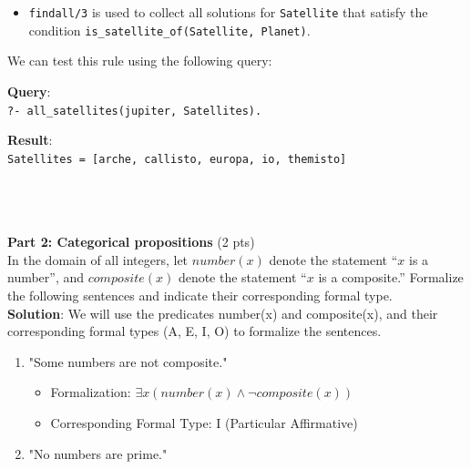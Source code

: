 \documentclass[12pt]{article}
\begin{document}
\begin{spacing}{1.5}
\begin{enumerate}
\begin{itemize}
		      	\item \texttt{findall/3} is used to collect all solutions for \texttt{Satellite} that satisfy the condition \texttt{is\_satellite\_of(Satellite, Planet)}.
		      \end{itemize}
		      		      		      		      		      		      		      		      
		      We can test this rule using the following query:
		      		      		      		      		      		      		      		      
		      \textbf{Query}:\\
		      \texttt{?- all\_satellites(jupiter, Satellites).}
		      		      		      		      		      		      		      		      
		      \textbf{Result}:\\
		      \texttt{Satellites = [arche, callisto, europa, io, themisto]}\\ \\ \\ \\
	\end{enumerate}
								
	\noindent \textbf{Part 2: Categorical propositions} (2 pts)\\
	In the domain of all integers, let $number(x)$ denote the statement “$x$ is a number”, and $composite(x)$ denote the statement “$x$ is a composite.” Formalize the following sentences and indicate their corresponding formal type.\\
							
	\textbf{Solution}: We will use the predicates number(x) and composite(x), and their corresponding formal types (A, E, I, O) to formalize the sentences.
								
	\begin{enumerate}
		\item "Some numbers are not composite."
		      		      		      		      		      		      		      
		      \begin{itemize}
		      	\item Formalization: $\exists x(number(x) \land \neg composite(x))$
		      	\item Corresponding Formal Type: I (Particular Affirmative)
		      \end{itemize}
		      		      		      		      		      		      		        
		\item "No numbers are prime."
		      		      		      		      		      		      		      

\end{enumerate}
\end{spacing}
\end{document}
